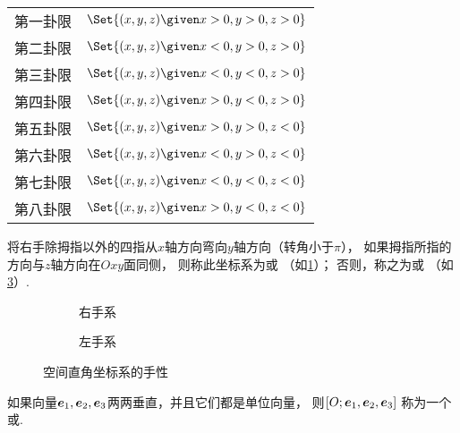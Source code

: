 \begin{table}
\centering
\def\guaxian#1#2#3{\Set{ (x,y,z) \given x #1 0, y #2 0, z #3 0 }}%
\def\arraystretch{1.2}%
\begin{tabular}{cl}%
第一卦限 & \(\guaxian{>}{>}{>}\) \\
第二卦限 & \(\guaxian{<}{>}{>}\) \\
第三卦限 & \(\guaxian{<}{<}{>}\) \\
第四卦限 & \(\guaxian{>}{<}{>}\) \\
第五卦限 & \(\guaxian{>}{>}{<}\) \\
第六卦限 & \(\guaxian{<}{>}{<}\) \\
第七卦限 & \(\guaxian{<}{<}{<}\) \\
第八卦限 & \(\guaxian{>}{<}{<}\) \\
\end{tabular}%
\caption{}
\label{table:解析几何.几何空间的八个卦限}
\end{table}

将右手除拇指以外的四指从\(x\)轴方向弯向\(y\)轴方向（转角小于\(\pi\)），
如果拇指所指的方向与\(z\)轴方向在\(Oxy\)面同侧，
则称此坐标系为或
（如\cref{figure:解析几何.右手系}）；
否则，称之为或
（如\cref{figure:解析几何.左手系}）.

\begin{figure}[htb]
	\centering
	\def\subwidth{.4\linewidth}
	\begin{subfigure}[b]{\subwidth}
		\centering
		\caption{右手系}
		\label{figure:解析几何.右手系}
	\end{subfigure}
	\begin{subfigure}[b]{\subwidth}
		\centering
		\caption{左手系}
		\label{figure:解析几何.左手系}
	\end{subfigure}
	\caption{空间直角坐标系的手性}
\end{figure}

\begin{definition}
如果向量\(\boldsymbol{e}_1,\boldsymbol{e}_2,\boldsymbol{e}_3\)两两垂直，并且它们都是单位向量，
则\([O;\boldsymbol{e}_1,\boldsymbol{e}_2,\boldsymbol{e}_3]\)
称为一个或.
\end{definition}

